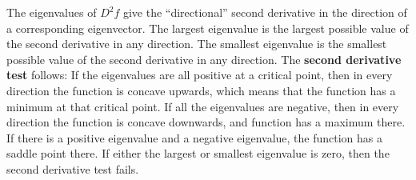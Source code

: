 
The eigenvalues of $D^2f$ give the ``directional'' second derivative
in the direction of a corresponding eigenvector. The largest
eigenvalue is the largest possible value of the second derivative in
any direction. The smallest eigenvalue is the smallest possible value
of the second derivative in any direction. The \textbf{second
derivative test} follows: If the eigenvalues are all positive at a
critical point, then in every direction the function is concave
upwards, which means that the function has a minimum at that critical
point.  If all the eigenvalues are negative, then in every direction
the function is concave downwards, and function has a maximum there. 
If there is a positive eigenvalue and a negative eigenvalue, the
function has a saddle point there.  If either the largest or smallest
eigenvalue is zero, then the second derivative test fails. 


